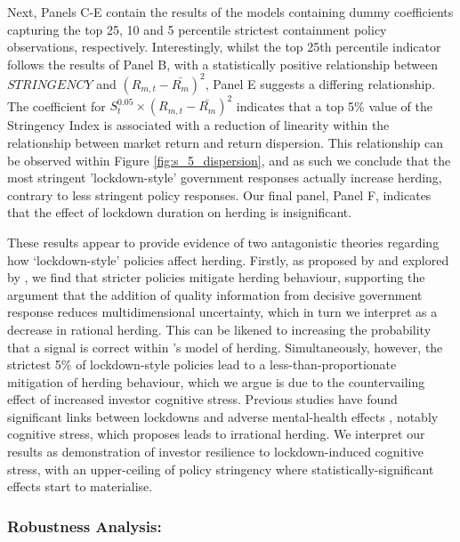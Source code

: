 \documentclass[12pt]{article}
\numberwithin{table}{section}   %
\begin{document}
Next, Panels C-E contain the results of the models containing dummy coefficients capturing the top 25, 10 and 5 percentile strictest containment policy observations, respectively. Interestingly, whilst the top 25th percentile indicator follows the results of Panel B, with a statistically positive relationship between $STRINGENCY$ and $(R_{m,t}-\bar{R_m})^2$, Panel E suggests a differing relationship. The coefficient for $S^{0.05}_t\times(R_{m,t}-\bar{R_m})^2$ indicates that a top 5\% value of the Stringency Index is associated with a reduction of linearity within the relationship between market return and return dispersion. This relationship can be observed within Figure \ref{fig:s_5_dispersion}, and as such we conclude that the most stringent 'lockdown-style' government responses actually increase herding, contrary to less stringent policy responses. Our final panel, Panel F, indicates that the effect of lockdown duration on herding is insignificant.

These results appear to provide evidence of two antagonistic theories regarding how ‘lockdown-style’ policies affect herding. Firstly, as proposed by \citet{sharif} and explored by \citet{kizys}, we find that stricter policies mitigate herding behaviour, supporting the argument that the addition of quality information from decisive government response reduces multidimensional uncertainty, which in turn we interpret as a decrease in rational herding. This can be likened to increasing the probability that a signal is correct within \citet{banerjee}'s model of herding. Simultaneously, however, the strictest 5\% of lockdown-style policies lead to a less-than-proportionate mitigation of herding behaviour, which we argue is due to the countervailing effect of increased investor cognitive stress. Previous studies have found significant links between lockdowns and adverse mental-health effects \citep{aknin, dubey}, notably cognitive stress, which \citet{pretcher} proposes leads to irrational herding. We interpret our results as demonstration of investor resilience to lockdown-induced cognitive stress, with an upper-ceiling of policy stringency where statistically-significant effects start to materialise.

\subsubsection*{Robustness Analysis:}
\end{document}

